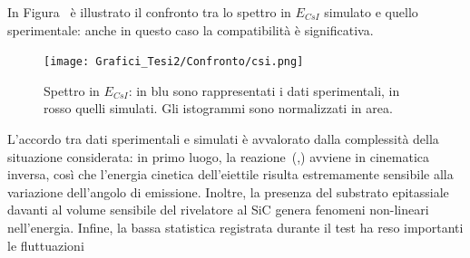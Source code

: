 In Figura~ è illustrato il confronto tra lo spettro in $E_{CsI}$ simulato e quello sperimentale: anche in questo caso la compatibilità è significativa.


\begin{figure} [!p]
	\centering
	\texttt{[image: Grafici\_Tesi2/Confronto/csi.png]}
	\caption{Spettro in $E_{CsI}$: in blu sono rappresentati i dati sperimentali, in rosso quelli simulati. Gli istogrammi sono normalizzati in area.} \label{fig:spettro_csi_confronto}
\end{figure}

L'accordo tra dati sperimentali e simulati è avvalorato dalla complessità della situazione considerata: in primo luogo, la reazione~(,) avviene in cinematica inversa, così che l'energia cinetica dell'eiettile risulta estremamente sensibile alla variazione dell'angolo di emissione. 
Inoltre, la presenza del substrato epitassiale davanti al volume sensibile del rivelatore al SiC genera fenomeni non-lineari nell'energia.
Infine, la bassa statistica registrata durante il test ha reso importanti le fluttuazioni 

